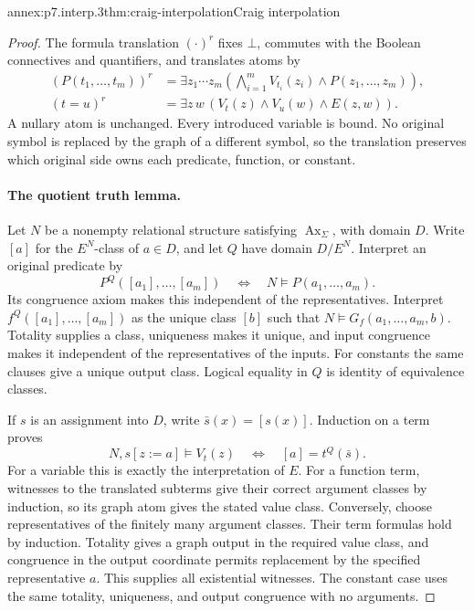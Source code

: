 \begin{annexitem}{annex:p7.interp.3}{thm:craig-interpolation}{Craig interpolation}
\begin{proof}
The formula translation \((\cdot)^r\) fixes \(\bot\), commutes with
the Boolean connectives and quantifiers, and translates atoms by
\[
\begin{aligned}
 (P(t_1,\ldots,t_m))^r
  &=\exists z_1\cdots z_m
       \left(\bigwedge_{i=1}^{m}V_{t_i}(z_i)
                       \land P(z_1,\ldots,z_m)\right),\\
 (t=u)^r
  &=\exists z\,w\,
       (V_t(z)\land V_u(w)\land E(z,w)).
\end{aligned}
\]
A nullary atom is unchanged.
Every introduced variable is bound.  No original symbol is replaced
by the graph of a different symbol, so the translation preserves
which original side owns each predicate, function, or constant.

\paragraph{The quotient truth lemma.}
Let \(N\) be a nonempty relational structure satisfying
\(\operatorname{Ax}_\Sigma\), with domain \(D\).
Write \([a]\) for the \(E^N\)-class of \(a\in D\), and let \(Q\)
have domain \(D/E^N\).
Interpret an original predicate by
\[
 P^Q([a_1],\ldots,[a_m])
       \quad\Longleftrightarrow\quad N\models P(a_1,\ldots,a_m).
\]
Its congruence axiom makes this independent of the representatives.
Interpret \(f^Q([a_1],\ldots,[a_m])\) as the unique class \([b]\)
such that \(N\models G_f(a_1,\ldots,a_m,b)\).
Totality supplies a class, uniqueness makes it unique, and input
congruence makes it independent of the representatives of the inputs.
For constants the same clauses give a unique output class.
Logical equality in \(Q\) is identity of equivalence classes.

If \(s\) is an assignment into \(D\), write \(\bar s(x)=[s(x)]\).
Induction on a term proves
\[
 N,s[z:=a]\models V_t(z)
 \quad\Longleftrightarrow\quad
 [a]=t^Q(\bar s).
\]
For a variable this is exactly the interpretation of \(E\).
For a function term, witnesses to the translated subterms give their
correct argument classes by induction, so its graph atom gives the
stated value class.  Conversely, choose representatives of the finitely
many argument classes.  Their term formulas hold by induction.
Totality gives a graph output in the required value class, and
congruence in the output coordinate permits replacement by the
specified representative \(a\).  This supplies all existential witnesses.
The constant case uses the same totality, uniqueness, and output
congruence with no arguments.


\end{proof}
\end{annexitem}
